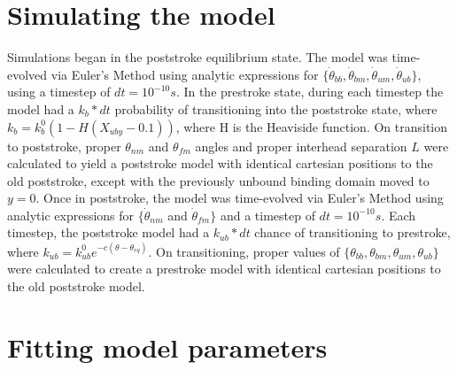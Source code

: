\documentclass[9pt,twocolumn,twoside]{article}
\begin{document}

\section*{Simulating the model}
Simulations began in the poststroke equilibrium state. The model was time-evolved via Euler's Method using analytic expressions for $\{\dot{\theta}_{bb}, \dot{\theta}_{bm}, \dot{\theta}_{um}, \dot{\theta}_{ub}\}$, using a timestep of $dt = 10^{-10}s$. In the prestroke state, during each timestep the model had a $k_b*dt$ probability of transitioning into the poststroke state, where $k_b = k_b^0\left(1-H\left(X_{uby}-0.1\right)\right)$, where H is the Heaviside function. On transition to poststroke, proper $\theta_{nm}$ and $\theta_{fm}$ angles and proper interhead separation $L$ were calculated to yield a poststroke model with identical cartesian positions to the old poststroke, except with the previously unbound binding domain moved to $y=0$. Once in poststroke, the model was time-evolved via Euler's Method using analytic expressions for $\{\dot{\theta}_{nm}$ and $\dot{\theta}_{fm}\}$ and a timestep of $dt=10^{-10}s$. Each timestep, the poststroke model had a $k_{ub}*dt$ chance of transitioning to prestroke, where $k_{ub} = k^0_{ub}e^{-c(\theta-\theta_{eq})}$. On transitioning, proper values of $\{\theta_{bb}, \theta_{bm}, \theta_{um}, \theta_{ub}\}$ were calculated to create a prestroke model with identical cartesian positions to the old poststroke model.



\section*{Fitting model parameters}
\end{document}
